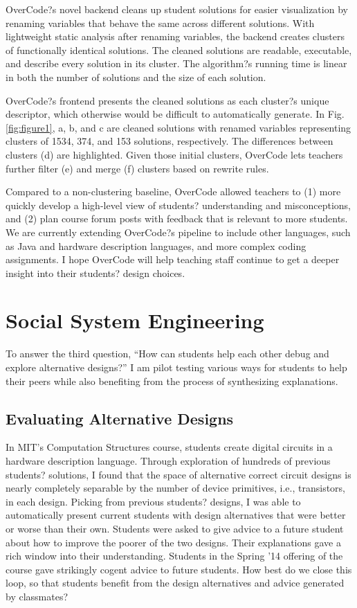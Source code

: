 \documentclass{sigchi}
\begin{document}
OverCode?s novel backend cleans up student solutions for easier visualization by renaming variables that behave the same across different solutions. With lightweight static analysis after renaming variables, the backend creates clusters of functionally identical solutions. The cleaned solutions are readable, executable, and describe every solution in its cluster. The algorithm?s running time is linear in both the number of solutions and the size of each solution. 

OverCode?s frontend presents the cleaned solutions as each cluster?s unique descriptor, which otherwise would be difficult to automatically generate. In Fig. \ref{fig:figure1}, a, b, and c are cleaned solutions with renamed variables representing clusters of 1534, 374, and 153 solutions, respectively. The differences between clusters (d) are highlighted. Given those initial clusters, OverCode lets teachers further filter (e) and merge (f) clusters based on rewrite rules.

Compared to a non-clustering baseline, OverCode allowed teachers to (1) more quickly develop a high-level view of students? understanding and misconceptions, and (2) plan course forum posts with feedback that is relevant to more students. We are currently extending OverCode?s pipeline to include other languages, such as Java and hardware description languages, and more complex coding assignments. I hope OverCode will help teaching staff continue to get a deeper insight into their students? design choices.


\section{Social System Engineering}
To answer the third question, ``How can students help each other debug and explore alternative designs?'' I am pilot testing various ways for students to help their peers while also benefiting from the process of synthesizing explanations.

\subsection{Evaluating Alternative Designs} In MIT's Computation Structures course, students create digital circuits in a hardware description language. Through exploration of hundreds of previous students? solutions, I found that the space of alternative correct circuit designs is nearly completely separable by the number of device primitives, i.e., transistors, in each design. Picking from previous students? designs, I was able to automatically present current students with design alternatives that were better or worse than their own. Students were asked to give advice to a future student about how to improve the poorer of the two designs. Their explanations gave a rich window into their understanding. Students in the Spring '14 offering of the course gave strikingly cogent advice to future students. How best do we close this loop, so that students benefit from the design alternatives and advice generated by classmates? 
\end{document}
